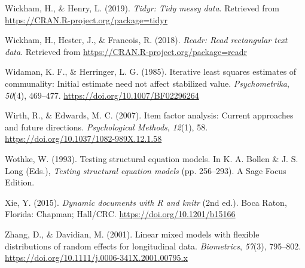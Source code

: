 \documentclass[
  english,
  man]{apa6}
\begin{document}
\leavevmode\hypertarget{ref-R-tidyr}{}%
Wickham, H., \& Henry, L. (2019). \emph{Tidyr: Tidy messy data}. Retrieved from \url{https://CRAN.R-project.org/package=tidyr}

\leavevmode\hypertarget{ref-R-readr}{}%
Wickham, H., Hester, J., \& Francois, R. (2018). \emph{Readr: Read rectangular text data}. Retrieved from \url{https://CRAN.R-project.org/package=readr}

\leavevmode\hypertarget{ref-widaman1985iterative}{}%
Widaman, K. F., \& Herringer, L. G. (1985). Iterative least squares estimates of communality: Initial estimate need not affect stabilized value. \emph{Psychometrika}, \emph{50}(4), 469--477. \url{https://doi.org/10.1007/BF02296264}

\leavevmode\hypertarget{ref-wirth2007item}{}%
Wirth, R., \& Edwards, M. C. (2007). Item factor analysis: Current approaches and future directions. \emph{Psychological Methods}, \emph{12}(1), 58. \url{https://doi.org/10.1037/1082-989X.12.1.58}

\leavevmode\hypertarget{ref-wothke1993}{}%
Wothke, W. (1993). Testing structural equation models. In K. A. Bollen \& J. S. Long (Eds.), \emph{Testing structural equation models} (pp. 256--293). A Sage Focus Edition.

\leavevmode\hypertarget{ref-R-knitr}{}%
Xie, Y. (2015). \emph{Dynamic documents with R and knitr} (2nd ed.). Boca Raton, Florida: Chapman; Hall/CRC. \url{https://doi.org/10.1201/b15166}

\leavevmode\hypertarget{ref-zhang2001}{}%
Zhang, D., \& Davidian, M. (2001). Linear mixed models with flexible distributions of random effects for longitudinal data. \emph{Biometrics}, \emph{57}(3), 795--802. \url{https://doi.org/10.1111/j.0006-341X.2001.00795.x}

\endgroup


\clearpage
\renewcommand{\listfigurename}{Figure captions}

\clearpage
\renewcommand{\listtablename}{Table captions}


\clearpage
\makeatletter
\efloat@restorefloats
\makeatother
\end{document}
